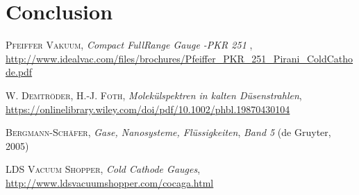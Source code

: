 \documentclass[a4paper,10pt]{article}
\begin{document}
\section{Conclusion}

\begin{thebibliography}{99}
\textsc{Pfeiffer Vakuum}, \textit{Compact FullRange Gauge -PKR 251 }, \url{http://www.idealvac.com/files/brochures/Pfeiffer_PKR_251_Pirani_ColdCathode.pdf}

\textsc{W. Demtröder, H.-J. Foth}, \textit{Molekülspektren in kalten Düsenstrahlen}, \url{https://onlinelibrary.wiley.com/doi/pdf/10.1002/phbl.19870430104}

\textsc{Bergmann-Schäfer}, \textit{Gase, Nanosysteme, Flüssigkeiten}, \textit{Band 5} (de Gruyter, 2005)

\textsc{LDS Vacuum Shopper}, \textit{Cold Cathode Gauges}, \url{http://www.ldsvacuumshopper.com/cocaga.html}
\end{thebibliography}
\end{document}
